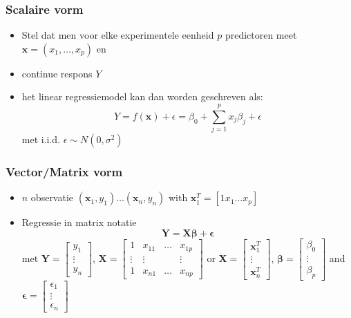 \documentclass[
]{article}
\providecommand{\tightlist}{%
  \setlength{\itemsep}{0pt}\setlength{\parskip}{0pt}}
\begin{document}
\hypertarget{scalaire-vorm}{%
\subsubsection{Scalaire vorm}\label{scalaire-vorm}}

\begin{itemize}
\tightlist
\item
  Stel dat men voor elke experimentele eenheid \(p\) predictoren meet
  \(\mathbf{x}=(x_1,\ldots,x_p)\) en
\item
  continue respons \(Y\)
\item
  het linear regressiemodel kan dan worden geschreven als: \[
  Y=f(\mathbf{x}) +\epsilon=\beta_0+\sum\limits_{j=1}^p x_j\beta_j + \epsilon
  \] met i.i.d. \(\epsilon\sim N(0,\sigma^2)\)
\end{itemize}

\hypertarget{vectormatrix-vorm}{%
\subsubsection{Vector/Matrix vorm}\label{vectormatrix-vorm}}

\begin{itemize}
\tightlist
\item
  \(n\) observatie \((\mathbf{x}_1,y_1) \ldots (\mathbf{x}_n,y_n)\) with
  \(\mathbf{x}_1^T=[1 x_1 \ldots x_p]\)
\item
  Regressie in matrix notatie
  \[\mathbf{Y}=\mathbf{X\beta} + \mathbf{\epsilon}\] met
  \(\mathbf{Y}=\left[\begin{array}{c}y_1\\ \vdots\\y_n\end{array}\right]\),
  \(\mathbf{X}=\left[\begin{array}{cccc} 1&x_{11}&\ldots&x_{1p}\\ \vdots&\vdots&&\vdots\\ 1&x_{n1}&\ldots&x_{np} \end{array}\right]\)
  or
  \(\mathbf{X}=\left[\begin{array}{c} \mathbf{x}_1^T\\\vdots\\\mathbf{x}_n^T\end{array}\right]\),
  \(\boldsymbol{\beta}=\left[\begin{array}{c}\beta_0\\ \vdots\\ \beta_p\end{array}\right]\)
  and
  \(\mathbf{\epsilon}=\left[\begin{array}{c} \epsilon_1 \\ \vdots \\ \epsilon_n\end{array}\right]\)
\end{itemize}
\end{document}
